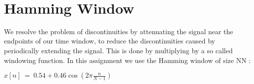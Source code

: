 \documentclass[11pt]{article}
\begin{document}
    \begin{center}
    \end{center}
    { \hspace*{\fill} \\}
    
    \section{Hamming Window}\label{hamming-window}

We resolve the problem of discontinuities by attenuating the signal near
the endpoints of our time window, to reduce the discontinuities caused
by periodically extending the signal. This is done by multiplying by a
so called windowing function. In this assignment we use the Hamming
window of size NN :

\(x[n]\ =\ 0.54 + 0.46\cos(2π\frac{n}{N−1})\)
\end{document}
